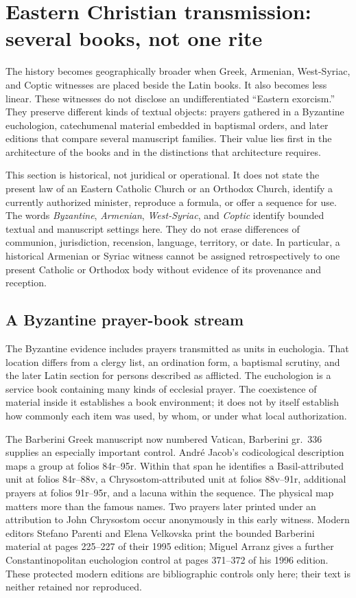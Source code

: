 \section{Eastern Christian transmission: several books, not one rite}

The history becomes geographically broader when Greek, Armenian, West-Syriac,
and Coptic witnesses are placed beside the Latin books. It also becomes less
linear. These witnesses do not disclose an undifferentiated ``Eastern
exorcism.'' They preserve different kinds of textual objects: prayers gathered
in a Byzantine euchologion, catechumenal material embedded in baptismal orders,
and later editions that compare several manuscript families. Their value lies
first in the architecture of the books and in the distinctions that architecture
requires.

This section is historical, not juridical or operational. It does not state the
present law of an Eastern Catholic Church or an Orthodox Church, identify a
currently authorized minister, reproduce a formula, or offer a sequence for
use. The words \emph{Byzantine}, \emph{Armenian}, \emph{West-Syriac}, and
\emph{Coptic} identify bounded textual and manuscript settings here. They do
not erase differences of communion, jurisdiction, recension, language,
territory, or date. In particular, a historical Armenian or Syriac witness
cannot be assigned retrospectively to one present Catholic or Orthodox body
without evidence of its provenance and reception.

\subsection{A Byzantine prayer-book stream}

The Byzantine evidence includes prayers transmitted as units in euchologia.
That location differs from a clergy list, an ordination form, a baptismal
scrutiny, and the later Latin section for persons described as afflicted. The
euchologion is a service book containing many kinds of ecclesial prayer. The
coexistence of material inside it establishes a book environment; it does not
by itself establish how commonly each item was used, by whom, or under what
local authorization.

The Barberini Greek manuscript now numbered Vatican, Barberini gr.~336 supplies
an especially important control. André Jacob's codicological description maps
a group at folios 84r--95r. Within that span he identifies a Basil-attributed
unit at folios 84r--88v, a Chrysostom-attributed unit at folios 88v--91r,
additional prayers at folios 91r--95r, and a lacuna within the sequence. The
physical map matters more than the famous names. Two prayers later printed
under an attribution to John Chrysostom occur anonymously in this early
witness. Modern editors Stefano Parenti and Elena Velkovska print the bounded
Barberini material at pages 225--227 of their 1995 edition; Miguel Arranz gives
a further Constantinopolitan euchologion control at pages 371--372 of his 1996
edition. These protected modern editions are bibliographic controls only here;
their text is neither retained nor reproduced.

